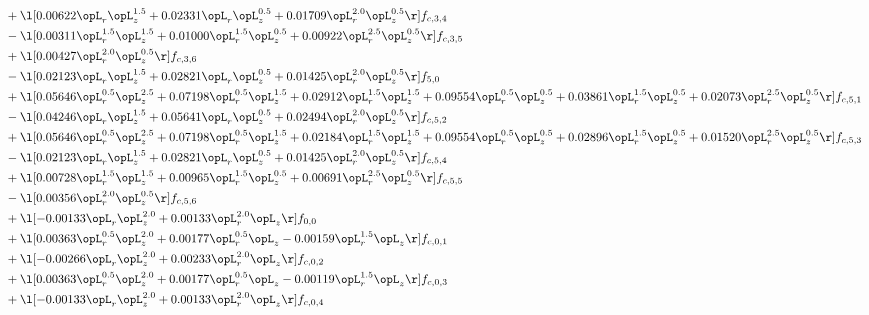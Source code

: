 \begin{alignat}{2}
& + \l[  0.00622 \opL_r \opL_z^{1.5} +  0.02331 \opL_r \opL_z^{0.5} +  0.01709 \opL_r^{2.0} \opL_z^{0.5}  \r] f_{c,3,4} \nonumber \\ 
& - \l[  0.00311 \opL_r^{1.5} \opL_z^{1.5} +  0.01000 \opL_r^{1.5} \opL_z^{0.5} +  0.00922 \opL_r^{2.5} \opL_z^{0.5}  \r] f_{c,3,5} \nonumber \\ 
& + \l[  0.00427 \opL_r^{2.0} \opL_z^{0.5}  \r] f_{c,3,6} \nonumber \\ 
& - \l[  0.02123 \opL_r \opL_z^{1.5} +  0.02821 \opL_r \opL_z^{0.5} +  0.01425 \opL_r^{2.0} \opL_z^{0.5}  \r] f_{5,0} \nonumber \\ 
& + \l[  0.05646 \opL_r^{0.5} \opL_z^{2.5} +  0.07198 \opL_r^{0.5} \opL_z^{1.5} +  0.02912 \opL_r^{1.5} \opL_z^{1.5} +  0.09554 \opL_r^{0.5} \opL_z^{0.5} +  0.03861 \opL_r^{1.5} \opL_z^{0.5} +  0.02073 \opL_r^{2.5} \opL_z^{0.5}  \r] f_{c,5,1} \nonumber \\ 
& - \l[  0.04246 \opL_r \opL_z^{1.5} +  0.05641 \opL_r \opL_z^{0.5} +  0.02494 \opL_r^{2.0} \opL_z^{0.5}  \r] f_{c,5,2} \nonumber \\ 
& + \l[  0.05646 \opL_r^{0.5} \opL_z^{2.5} +  0.07198 \opL_r^{0.5} \opL_z^{1.5} +  0.02184 \opL_r^{1.5} \opL_z^{1.5} +  0.09554 \opL_r^{0.5} \opL_z^{0.5} +  0.02896 \opL_r^{1.5} \opL_z^{0.5} +  0.01520 \opL_r^{2.5} \opL_z^{0.5}  \r] f_{c,5,3} \nonumber \\ 
& - \l[  0.02123 \opL_r \opL_z^{1.5} +  0.02821 \opL_r \opL_z^{0.5} +  0.01425 \opL_r^{2.0} \opL_z^{0.5}  \r] f_{c,5,4} \nonumber \\ 
& + \l[  0.00728 \opL_r^{1.5} \opL_z^{1.5} +  0.00965 \opL_r^{1.5} \opL_z^{0.5} +  0.00691 \opL_r^{2.5} \opL_z^{0.5}  \r] f_{c,5,5} \nonumber \\ 
& - \l[  0.00356 \opL_r^{2.0} \opL_z^{0.5}  \r] f_{c,5,6} \nonumber \\ 
& + \l[  -0.00133 \opL_r \opL_z^{2.0} +  0.00133 \opL_r^{2.0} \opL_z  \r] f_{0,0} \nonumber \\ 
& + \l[  0.00363 \opL_r^{0.5} \opL_z^{2.0} +  0.00177 \opL_r^{0.5} \opL_z   -0.00159 \opL_r^{1.5} \opL_z  \r] f_{c,0,1} \nonumber \\ 
& + \l[  -0.00266 \opL_r \opL_z^{2.0} +  0.00233 \opL_r^{2.0} \opL_z  \r] f_{c,0,2} \nonumber \\ 
& + \l[  0.00363 \opL_r^{0.5} \opL_z^{2.0} +  0.00177 \opL_r^{0.5} \opL_z   -0.00119 \opL_r^{1.5} \opL_z  \r] f_{c,0,3} \nonumber \\ 
& + \l[  -0.00133 \opL_r \opL_z^{2.0} +  0.00133 \opL_r^{2.0} \opL_z  \r] f_{c,0,4} \nonumber \\ 

\end{alignat}
